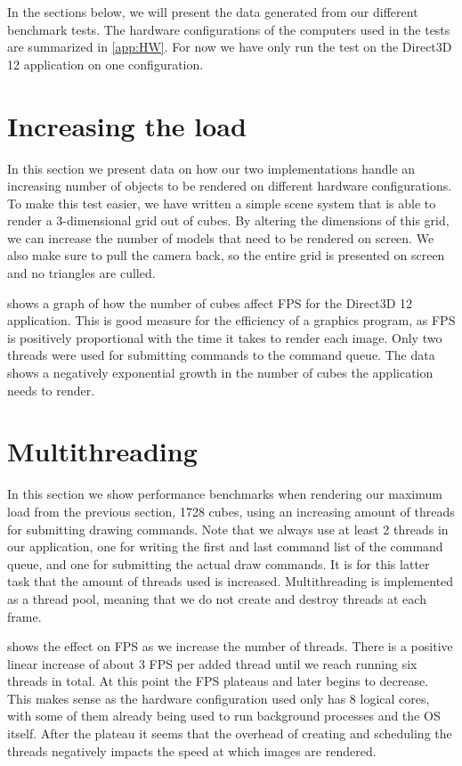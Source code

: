 In the sections below, we will present the data generated from our different benchmark tests. The hardware configurations of the computers used in the tests are summarized in \cref{app:HW}. For now we have only run the test on the Direct3D 12 application on one configuration.

\section{Increasing the load}
In this section we present data on how our two implementations handle an increasing number of objects to be rendered on different hardware configurations. 
To make this test easier, we have written a simple scene system that is able to render a 3-dimensional grid out of cubes.
By altering the dimensions of this grid, we can increase the number of models that need to be rendered on screen. We also make sure to pull the camera back, so the entire grid is presented on screen and no triangles are culled. 


 shows a graph of how the number of cubes affect \gls{FPS} for the Direct3D 12 application.
This is good measure for the efficiency of a graphics program, as \gls{FPS} is positively proportional with the time it takes to render each image. 
Only two threads were used for submitting commands to the command queue.
The data shows a negatively exponential growth in the number of cubes the application needs to render. 
 
 

\section{Multithreading}
In this section we show performance benchmarks when rendering our maximum load from the previous section, 1728 cubes, using an increasing amount of threads for submitting drawing commands.
Note that we always use at least 2 threads in our application, one for writing the first and last command list of the command queue, and one for submitting the actual draw commands.
It is for this latter task that the amount of threads used is increased. Multithreading is implemented as a thread pool, meaning that we do not create and destroy threads at each frame.


 shows the effect on \gls{FPS} as we increase the number of threads.
There is a positive linear increase of about 3 \gls{FPS} per added thread until we reach running six threads in total.
At this point the \gls{FPS} plateaus and later begins to decrease.
This makes sense as the hardware configuration used only has 8 logical cores, with some of them already being used to run background processes and the \gls{OS} itself.
After the plateau it seems that the overhead of creating and scheduling the threads negatively impacts the speed at which images are rendered.


